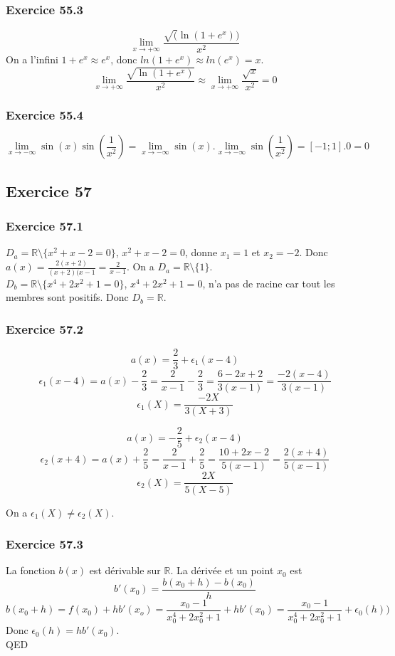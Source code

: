 \documentclass[]{book}
\theoremstyle{definition}
\newcommand{\bb}[1]{\mathbb{#1}}
\newcommand{\R}{\bb{R}}
\begin{document}
\subsubsection*{Exercice 55.3}
$$\lim_{x\to+\infty}\frac{\sqrt(\ln(1+e^x))}{x^2}$$
On a l'infini $1+e^x \approx e^x$, donc $ln(1+e^x) \approx ln(e^x) = x$.\\
$$\lim_{x\to+\infty}\frac{\sqrt{\ln(1+e^x)}}{x^2} \approx \lim_{x\to+\infty}\frac{\sqrt{x}}{x^2} = 0$$

\subsubsection*{Exercice 55.4}
$$\lim_{x\to-\infty}\sin(x)\sin(\frac{1}{x^2}) = \lim_{x\to-\infty}\sin(x).\lim_{x\to-\infty}\sin(\frac{1}{x^2}) = [-1;1].0 = 0$$


\subsection*{Exercice 57}
\subsubsection*{Exercice 57.1}

$D_a = \R \setminus\{x^2+x-2 = 0\}$, $x^2+x-2 = 0$, donne $x_1 = 1$ et $x_2 = -2$. Donc $a(x) = \frac{2(x+2)}{(x+2)(x-1} = \frac{2}{x-1}$. On a $D_a = \R \setminus\{1\}$.\\
$D_b = \R \setminus\{x^4+2x^2+1 = 0\}$, $x^4+2x^2+1 = 0$, n'a pas de racine car tout les membres sont positifs. Donc $D_b = \R$.\\

\subsubsection*{Exercice 57.2}
$$a(x) = \frac{2}{3} + \epsilon_1(x-4)$$
$$\epsilon_1(x-4) = a(x) - \frac{2}{3} = \frac{2}{x-1} - \frac{2}{3} = \frac{6-2x+2}{3(x-1)} = \frac{-2(x-4)}{3(x-1)}$$
$$\epsilon_1(X) = \frac{-2X}{3(X+3)}$$

$$a(x) = -\frac{2}{5} + \epsilon_2(x-4)$$
$$\epsilon_2(x+4) = a(x) + \frac{2}{5} = \frac{2}{x-1} + \frac{2}{5} = \frac{10+2x-2}{5(x-1)} = \frac{2(x+4)}{5(x-1)}$$
$$\epsilon_2(X) = \frac{2X}{5(X-5)}$$

On a $\epsilon_1(X) \neq \epsilon_2(X)$.

\subsubsection*{Exercice 57.3}
La fonction $b(x)$ est d\'erivable sur $\R$. La d\'eriv\'ee et un point $x_0$ est\\
$$b'(x_0) = \frac{b(x_0+h)-b(x_0)}{h}$$
$$b(x_0+h) = f(x_0) + hb'(x_o) = \frac{x_0-1}{x_0^4+2x_0^2+1} +hb'(x_0) = \frac{x_0-1}{x_0^4+2x_0^2+1} +\epsilon_0(h))$$
Donc $\epsilon_0(h) = hb'(x_0)$.\\

QED
\end{document}

